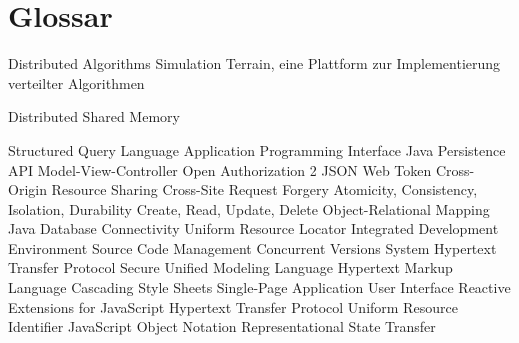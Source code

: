 \chapter{Glossar}

		{Distributed Algorithms Simulation Terrain, eine Plattform zur Implementierung verteilter Algorithmen}

			{Distributed Shared Memory}

			{Structured Query Language}
			{Application Programming Interface}
			{Java Persistence API}
			{Model-View-Controller}
		{Open Authorization 2}
			{JSON Web Token}
			{Cross-Origin Resource Sharing}
			{Cross-Site Request Forgery}
			{Atomicity, Consistency, Isolation, Durability}
			{Create, Read, Update, Delete}
			{Object-Relational Mapping}
		{Java Database Connectivity Uniform Resource Locator}
			{Integrated Development Environment}
	      {Source Code Management }
			{Concurrent Versions System}
		{Hypertext Transfer Protocol Secure}
			{Unified Modeling Language}
			{Hypertext Markup Language}
			{Cascading Style Sheets}
			{Single-Page Application}
			{User Interface}
			{Reactive Extensions for JavaScript}
			{Hypertext Transfer Protocol}
			{Uniform Resource Identifier}
			{JavaScript Object Notation}
		{Representational State Transfer}


